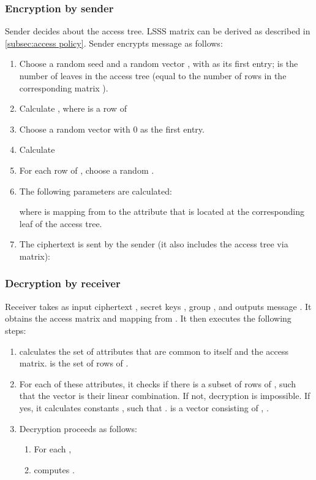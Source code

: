 \documentclass[conference]{IEEEtran}[10pt]
\begin{document}
\subsubsection{Encryption by sender}
Sender decides about the access tree. 
LSSS matrix  can be derived as described in \ref{subsec:access policy}.
Sender encrypts message  as follows: 
\begin{enumerate}
\item Choose a random seed  and a random vector , with  as its first entry;  is the number of leaves in the access tree (equal to the number of rows in the corresponding matrix ).
\item Calculate , where  is a row of 
\item Choose a random vector  with 0 as the first entry.
\item Calculate 
\item For each row  of , choose a random .
\item The following parameters are calculated:

where  is mapping from  to the attribute  that is located at the corresponding leaf of the access tree.
\item The ciphertext  is sent by the sender (it also includes the access tree via  matrix):

\end{enumerate}

\subsubsection{Decryption by receiver}
\label{subsubsec:decrypt}
Receiver  takes as input ciphertext , secret keys , group , and outputs message . 
It obtains the access matrix  and mapping  from . 
It then executes the following steps:
\begin{enumerate}
\item  calculates the set of attributes  that are common to itself and  
the access matrix.  is the set of rows of . 
\item For each of these attributes, it checks if there is a subset  of rows of , such that
the vector  is their linear combination.
If not, decryption is impossible. If yes, it
calculates constants , 
such that . 
 is a vector consisting of , . 
\item Decryption proceeds as follows:
\begin{enumerate}
\item  
For each ,

\item  computes .
\end{enumerate}
\end{enumerate} 
\end{document}

